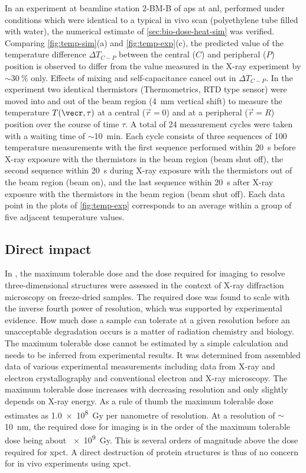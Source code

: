 \documentclass[
twoside,
openright,
titlepage,
numbers=noenddot,
headinclude,
fleqn,
a4paper,
footinclude=true,
cleardoublepage=empty,
abstractoff,
BCOR=5mm,
paper=a4,
fontsize=11pt,
british,ngerman,american,
]{scrreprt}
\begin{document}
In an experiment at beamline station 2-BM-B of \ac{aps} at \ac{anl},
performed under conditions which were identical to a typical in vivo
scan (polyethylene tube filled with water), the numerical estimate of
\cref{sec:bio-dose-heat-sim} was verified.  Comparing
\cref{fig:temp-sim}(a) and \cref{fig:temp-exp}(c), the predicted value
of the temperature difference $\Delta T_{C-P}$ between the central
($C$) and peripheral ($P$) position is observed to differ from the
value measured in the X-ray experiment by $\sim\SI{30}{\percent}$
only.  Effects of mixing and self-capacitance cancel out in $\Delta
T_{C-P}$.  In the experiment two identical thermistors (Thermometrics,
RTD type sensor) were moved into and out of the beam region
(\SI{4}{mm} vertical shift) to measure the temperature $T(\vecr,\tau)$
at a central ($\vec{r}=0$) and at a peripheral ($\vec{r}=R$) position
over the course of time $\tau$.  A total of 24 measurement cycles were
taken with a waiting time of $\sim$\SI{10}{min}.  Each cycle consists
of three sequences of 100 temperature measurements with the first
sequence performed within \SI{20}{s} before X-ray exposure with the
thermistors in the beam region (beam shut off), the second sequence
within \SI{20}{s} during X-ray exposure with the thermistors out of
the beam region (beam on), and the last sequence within \SI{20}{s}
after X-ray exposure with the thermistors in the beam region (beam
shut off).  Each data point in the plots of \cref{fig:temp-exp}
corresponds to an average within a group of five adjacent temperature
values.


\subsection{Direct impact}
\label{sec:bio-dose-direct}

In \cite{Howells2009}, the maximum tolerable dose and the dose
required for imaging to resolve three-dimensional structures were
assessed in the context of X-ray diffraction microscopy on
freeze-dried samples.
The required dose was found to scale with the inverse fourth power of
resolution, which was supported by experimental evidence.  How much
dose a sample can tolerate at a given resolution before an
unacceptable degradation occurs is a matter of radiation chemistry and
biology.  The maximum tolerable dose cannot be estimated by a simple
calculation and needs to be inferred from experimental results.  It
was determined from assembled data of various experimental
measurements including data from X-ray and electron crystallography
and conventional electron and X-ray microscopy.  The maximum tolerable
dose increases with decreasing resolution and only slightly depends on
 X-ray energy.  As a rule of thumb the maximum tolerable dose
estimates as \SI{1.0e8}{Gy} per nanometre of resolution.  At a
resolution of $\sim$\SI{10}{nm}, the required dose for imaging is in
the order of the maximum tolerable dose being about \SI{e9}{Gy}.  This
is several orders of magnitude above the dose required for \ac{xpct}.
A direct destruction of protein structures is thus of no concern for
in vivo experiments using \ac{xpct}.
\end{document}
